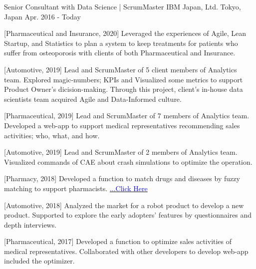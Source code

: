 

\begin{cventries}

  \cventry
    {Senior Consultant with Data Science | ScrumMaster} %
    {IBM Japan, Ltd.} %
    {Tokyo, Japan} %
    {Apr. 2016 - Today} %
    {
      \begin{cvitems} %
        \item {[Pharmaceutical and Insurance, 2020] Leveraged the experiences of Agile, Lean Startup, and Statistics to plan a system to keep treatments for patients who suffer from osteoporosis with clients of both Pharmaceutical and Insurance.}
        \item {[Automotive, 2019] Lead and ScrumMaster of 5 client members of Analytics team. Explored magic-numbers; KPIs and Visualized some metrics to support Product Owner's dicision-making. Through this project, client's in-house data scientists team acquired Agile and Data-Informed culture.}
        \item {[Pharmaceutical, 2019] Lead and ScrumMaster of 7 members of Analytics team. Developed a web-app to support medical representatives recommending sales activities; who, what, and how.}
        \item {[Automotive, 2019] Lead and ScrumMaster of 2 members of Analytics team. Visualized commands of CAE about crash simulations to optimize the operation.}
        \item {[Pharmacy, 2018] Developed a function to match drugs and diseases by fuzzy matching to support pharmacists. \href{https://www.ibm.com/think/jp-ja/business/sakura-ai/}{\textcolor{blue}{...Click Here}}}
        \item {[Automotive, 2018] Analyzed the market for a robot product to develop a new product. Supported to explore the early adopters' features by questionnaires and depth interviews.}
        \item {[Pharmaceutical, 2017] Developed a function to optimize sales activities of medical representatives. Collaborated with other developers to develop web-app included the optimizer.}

\end{cvitems}}
\end{cventries}
